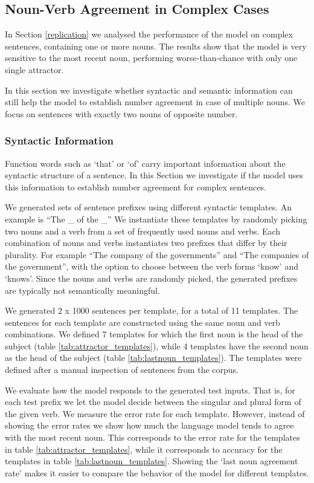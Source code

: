 \begin{multicols}{2}
\subsection{Noun-Verb Agreement in Complex Cases}

In Section \ref{replication} we analysed the performance of the model
on complex sentences, containing one or more 
nouns.
The results show that the model is very
sensitive to the most recent noun,
performing worse-than-chance with only one single attractor.

In this section we investigate whether
syntactic and semantic information
can still help the model 
to establish number agreement
in case of multiple nouns.
We focus on sentences with exactly two nouns
of opposite number.


\subsubsection{Syntactic Information}

Function words such as `that' or `of' carry 
important information about the syntactic structure of a sentence.
In this Section we investigate if the model
uses this information to establish number agreement
for complex sentences.

We generated sets of sentence prefixes using 
different syntactic templates.
An example is ``The \_ of the \_''
We instantiate these templates by randomly
picking two nouns and a verb 
from a set of frequently used nouns and verbs. 
Each combination of nouns and verbs instantiates
two prefixes that differ by their plurality.
For example ``The company of the governments''
and ``The companies of the government'',
with the option to choose between the verb forms
`know' and `knows'.
Since the nouns and verbs are randomly picked,
the generated prefixes 
are typically not semantically
meaningful.

We generated 2 x 1000 sentences per template,
for a total of 11 templates.
The sentences for each template are constructed using the same
noun and verb combinations.
We defined 7 templates for which the first noun is 
the head of the subject (table \ref{tab:attractor_templates}),
while 4 templates have the second noun as the head of the subject
(table \ref{tab:lastnoun_templates}).
The templates were defined after a manual inspection
of sentences from the corpus.

We evaluate how the model responds to the generated test inputs.
That is, for each test prefix we let the model decide between 
the singular and plural form of the given verb. 
We measure the error rate for each template.
However, instead of showing the error rates we
show how much the language model tends to agree with the most recent noun.
This corresponds to the error rate for the templates in table \ref{tab:attractor_templates},
while it corresponds to accuracy for the templates in table \ref{tab:lastnoun_templates}.
Showing the `last noun agreement rate' makes it easier
to compare the behavior of the model for different templates.


\end{multicols}
